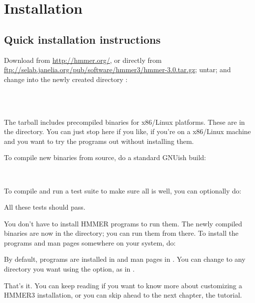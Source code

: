 \section{Installation}
\label{section:installation}
\setcounter{footnote}{0}

\subsection{Quick installation instructions}

Download  from
\url{http://hmmer.org/}, or directly from
\url{ftp://selab.janelia.org/pub/software/hmmer3/hmmer-3.0.tar.gz};
untar; and change into the newly created directory :

\\
\\

The tarball includes precompiled binaries for x86/Linux
platforms. These are in the  directory. You can just
stop here if you like, if you're on a x86/Linux machine and you want
to try the programs out without installing them.

To compile new binaries from source, do a standard GNUish build:

\\ 

To compile and run a test suite to make sure all is well, you can
optionally do:


All these tests should pass.

You don't have to install HMMER programs to run them. The newly
compiled binaries are now in the  directory; you can run
them from there. To install the programs and man pages somewhere on
your system, do:


By default, programs are installed in  and man
pages in . You can change 
to any directory you want using the 
option, as in .

That's it.  You can keep reading if you want to know more about
customizing a HMMER3 installation, or you can skip ahead to the next
chapter, the tutorial.




